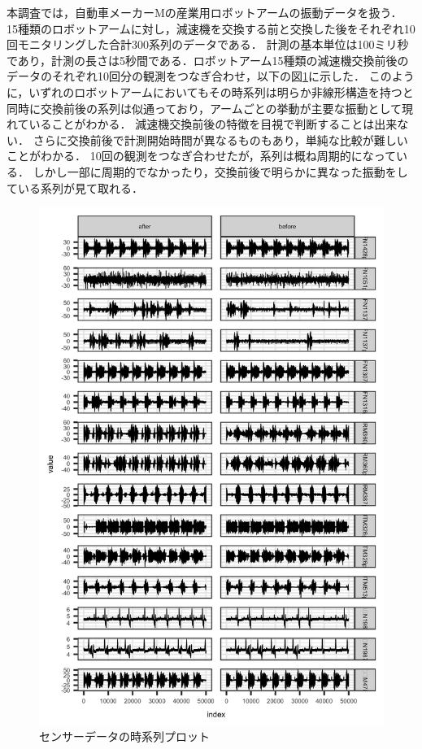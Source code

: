 \documentclass{jarticle}
\begin{document}
本調査では，自動車メーカーMの産業用ロボットアームの振動データを扱う．
15種類のロボットアームに対し，減速機を交換する前と交換した後をそれぞれ10回モニタリングした合計300系列のデータである．
計測の基本単位は100ミリ秒であり，計測の長さは5秒間である．ロボットアーム15種類の減速機交換前後のデータのそれぞれ10回分の観測をつなぎ合わせ，以下の図\ref{fig:ts}に示した．
このように，いずれのロボットアームにおいてもその時系列は明らか非線形構造を持つと同時に交換前後の系列は似通っており，アームごとの挙動が主要な振動として現れていることがわかる．
減速機交換前後の特徴を目視で判断することは出来ない．
さらに交換前後で計測開始時間が異なるものもあり，単純な比較が難しいことがわかる．
10回の観測をつなぎ合わせたが，系列は概ね周期的になっている．
しかし一部に周期的でなかったり，交換前後で明らかに異なった振動をしている系列が見て取れる．
\begin{figure}[H]
\begin{center}
	\includegraphics[width=12cm]{fig/ts.png}	
	\caption{センサーデータの時系列プロット}\label{fig:ts}
\end{center}
\end{figure}
\end{document}
